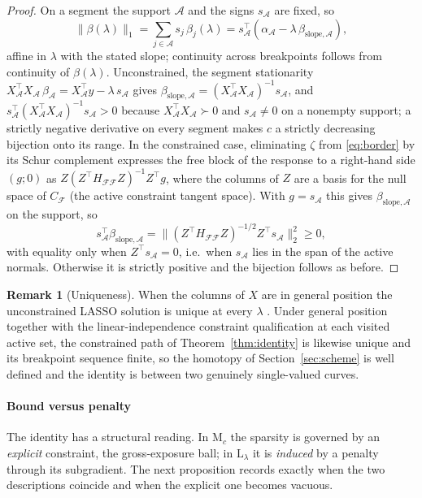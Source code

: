\documentclass[sts]{imsart}
\newcommand{\F}{\mathcal{F}}
\newcommand{\Aset}{\mathcal{A}}
\newcommand{\trans}{^{\top}}
\theoremstyle{plain}
\theoremstyle{definition}
\newtheorem{remark}{Remark}
\begin{document}
\begin{proof}
On a segment the support $\Aset$ and the signs $s_\Aset$ are fixed, so
\[
\|\beta(\lambda)\|_1 = \sum_{j\in\Aset} s_j\,\beta_j(\lambda)
= s_\Aset\trans(\alpha_\Aset - \lambda\,\beta_{\mathrm{slope},\Aset}),
\]
affine in $\lambda$ with the stated slope; continuity across breakpoints follows from continuity
of $\beta(\lambda)$. Unconstrained, the segment stationarity
$X_\Aset\trans X_\Aset\,\beta_\Aset = X_\Aset\trans y - \lambda\,s_\Aset$ gives
$\beta_{\mathrm{slope},\Aset} = (X_\Aset\trans X_\Aset)^{-1}s_\Aset$, and
$s_\Aset\trans(X_\Aset\trans X_\Aset)^{-1}s_\Aset > 0$ because
$X_\Aset\trans X_\Aset\succ0$ and $s_\Aset\neq0$ on a nonempty support; a strictly
negative derivative on every segment makes $c$ a strictly decreasing bijection onto its
range. In the constrained case, eliminating $\zeta$ from \eqref{eq:border} by its Schur
complement expresses the free block of the response to a right-hand side $(g;0)$ as
$Z(Z\trans H_{\F\F} Z)^{-1}Z\trans g$, where the columns of $Z$ are a basis for the null
space of $C_\F$ (the active constraint tangent space). With $g=s_\Aset$ this gives
$\beta_{\mathrm{slope},\Aset}$ on the support, so
\[
s_\Aset\trans\beta_{\mathrm{slope},\Aset}
= \big\|(Z\trans H_{\F\F}Z)^{-1/2}Z\trans s_\Aset\big\|_2^2 \ge 0,
\]
with equality only when $Z\trans s_\Aset = 0$, i.e.\ when $s_\Aset$ lies in the span of
the active normals.
Otherwise it is strictly positive and the bijection follows as before.
\end{proof}

\begin{remark}[Uniqueness]
When the columns of $X$ are in general position the unconstrained LASSO solution is
unique at every $\lambda$ \citep{tibshirani2013}. Under general position together with
the linear-independence constraint qualification at each visited active set, the
constrained path of Theorem~\ref{thm:identity} is likewise unique and its breakpoint
sequence finite, so the homotopy of Section~\ref{sec:scheme} is well defined and the
identity is between two genuinely single-valued curves.
\end{remark}

\paragraph{Bound versus penalty}
The identity has a structural reading. In $\mathrm{M}_c$ the sparsity is governed by
an \emph{explicit} constraint, the gross-exposure ball; in $\mathrm{L}_\lambda$ it is
\emph{induced} by a penalty through its subgradient. The next proposition records
exactly when the two descriptions coincide and when the explicit one becomes vacuous.
\end{document}
